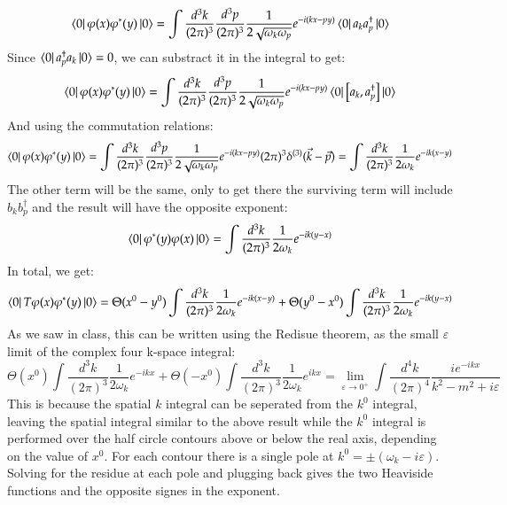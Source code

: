 \documentclass{article}
\begin{document}
\begin{equation}
    \bra{0}\varphi(x)\varphi^*(y)\ket{0} = \int \frac{d^3k}{(2\pi)^3}\frac{d^3p}{(2\pi)^3}\frac{1}{2\sqrt{\omega_k\omega_p}}e^{-i(kx - py)}
    \bra{0}a_ka_p^\dagger\ket{0}
\end{equation}
Since $\bra{0}a_p^\dagger a_k\ket{0} = 0$, we can substract it in the integral to get:
\begin{equation}
    \bra{0}\varphi(x)\varphi^*(y)\ket{0} = \int \frac{d^3k}{(2\pi)^3}\frac{d^3p}{(2\pi)^3}\frac{1}{2\sqrt{\omega_k\omega_p}}e^{-i(kx - py)}
    \bra{0}\left[a_k, a_p^\dagger\right]\ket{0}
\end{equation}
And using the commutation relations:
\begin{equation}
    \bra{0}\varphi(x)\varphi^*(y)\ket{0} = \int \frac{d^3k}{(2\pi)^3}\frac{d^3p}{(2\pi)^3}\frac{1}{2\sqrt{\omega_k\omega_p}}e^{-i(kx - py)}
    (2\pi)^3\delta^{(3)}(\vec{k} - \vec{p}) = 
    \int \frac{d^3k}{(2\pi)^3}\frac{1}{2\omega_k}e^{-ik(x - y)}
\end{equation}
The other term will be the same, only to get there the surviving term will include $b_kb_p^\dagger$ and the result will have the opposite exponent:
\begin{equation}
    \bra{0}\varphi^*(y)\varphi(x)\ket{0} = 
    \int \frac{d^3k}{(2\pi)^3}\frac{1}{2\omega_k}e^{-ik(y - x)}
\end{equation}
In total, we get:
\begin{equation}
    \bra{0}T\varphi(x)\varphi^*(y)\ket{0} = \Theta(x^0 - y^0)\int \frac{d^3k}{(2\pi)^3}\frac{1}{2\omega_k}e^{-ik(x - y)} + \Theta(y^0 - x^0)\int \frac{d^3k}{(2\pi)^3}\frac{1}{2\omega_k}e^{-ik(y - x)}
\end{equation}
As we saw in class, this can be written using the Redisue theorem, as the small $\varepsilon$ limit of the complex four k-space integral:
\begin{equation}
    \Theta(x^0)\int \frac{d^3k}{(2\pi)^3}\frac{1}{2\omega_k}e^{-ikx} + \Theta(- x^0)\int \frac{d^3k}{(2\pi)^3}\frac{1}{2\omega_k}e^{ikx} = 
    \lim_{\varepsilon \rightarrow 0^{+}}\int \frac{d^4k}{(2\pi)^4}\frac{ie^{-ikx}}{k^2 - m^2 + i\varepsilon}
\end{equation}
This is because the spatial $k$ integral can be seperated from the $k^0$ integral, leaving the spatial integral similar to the above result while the $k^0$ integral is performed over the half circle contours above or below the real axis, depending on the value of $x^0$. For each contour there is a single pole at $k^0 = \pm \left(\omega_k - i\varepsilon\right)$. Solving for the residue at each pole and plugging back gives the two Heaviside functions and the opposite signes in the exponent.
\end{document}
